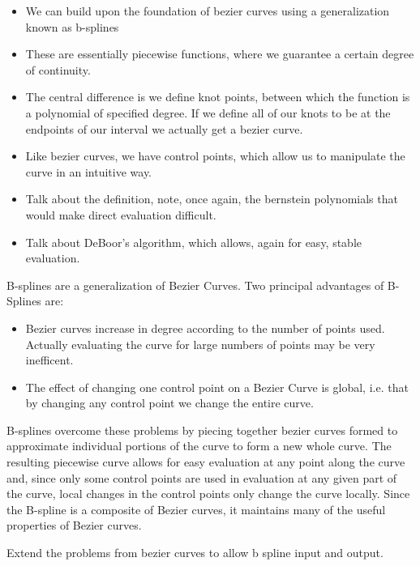 \begin{itemize}
\item We can build upon the foundation of bezier curves using a generalization known as b-splines
\item These are essentially piecewise functions, where we guarantee a certain degree of continuity.
\item The central difference is we define knot points, between which the function is a polynomial of specified degree. If we define all of our knots to be at the endpoints of our interval we actually get a bezier curve.
\item Like bezier curves, we have control points, which allow us to manipulate the curve in an intuitive way.
\item Talk about the definition, note, once again, the bernstein polynomials that would make direct evaluation difficult.
\item Talk about DeBoor's algorithm, which allows, again for easy, stable evaluation.
\end{itemize}

B-splines are a generalization of Bezier Curves. Two principal advantages of B-Splines are:

\begin{itemize}

\item Bezier curves increase in degree according to the number of points used. Actually evaluating the curve for large numbers of points may be very inefficent.

\item The effect of changing one control point on a Bezier Curve is global, i.e. that by changing any control point we change the entire curve. 

\end{itemize}

B-splines overcome these problems by piecing together bezier curves formed to approximate individual portions of the curve to form a new whole curve. The resulting piecewise curve allows for easy evaluation at any point along the curve and, since only some control points are used in evaluation at any given part of the curve, local changes in the control points only change the curve locally. Since the B-spline is a composite of Bezier curves, it maintains many of the useful properties of Bezier curves. 

\begin{problem}
Extend the problems from bezier curves to allow b spline input and output.
\end{problem}